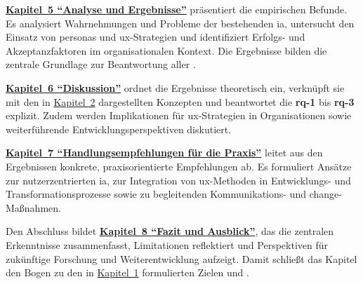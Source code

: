 \textbf{\hyperref[ch:05_analysis-and-results]{Kapitel~5 \enquote{Analyse und Ergebnisse}}} präsentiert die empirischen Befunde. Es analysiert Wahrnehmungen und Probleme der bestehenden \Gls{ia}, untersucht den Einsatz von \Gls{personas} und \Gls{ux}-Strategien und identifiziert Erfolgs- und Akzeptanzfaktoren im organisationalen Kontext. Die Ergebnisse bilden die zentrale Grundlage zur Beantwortung aller .

\textbf{\hyperref[ch:06_discussion]{Kapitel~6 \enquote{Diskussion}}} ordnet die Ergebnisse theoretisch ein, verknüpft sie mit den in \hyperref[ch:02_theoretical-foundations]{Kapitel~2} dargestellten Konzepten und beantwortet die  \textbf{\Gls{rq}-1} bis \textbf{\Gls{rq}-3} explizit. Zudem werden Implikationen für \Gls{ux}-Strategien in Organisationen sowie weiterführende Entwicklungsperspektiven diskutiert.

\textbf{\hyperref[ch:07_recommendations]{Kapitel~7 \enquote{Handlungsempfehlungen für die Praxis}}} leitet aus den Ergebnissen konkrete, praxisorientierte Empfehlungen ab. Es formuliert Ansätze zur nutzerzentrierten \Gls{ia}, zur Integration von \Gls{ux}-Methoden in Entwicklungs- und Transformationsprozesse sowie zu begleitenden Kommunikations- und \Gls{change}-Maßnahmen.

Den Abschluss bildet \textbf{\hyperref[ch:08_conclusion-and-outlook]{Kapitel~8 \enquote{Fazit und Ausblick}}}, das die zentralen Erkenntnisse zusammenfasst, Limitationen reflektiert und Perspektiven für zukünftige Forschung und Weiterentwicklung aufzeigt. Damit schließt das Kapitel den Bogen zu den in \hyperref[ch:01_purpose-and-objectives]{Kapitel~1} formulierten Zielen und .